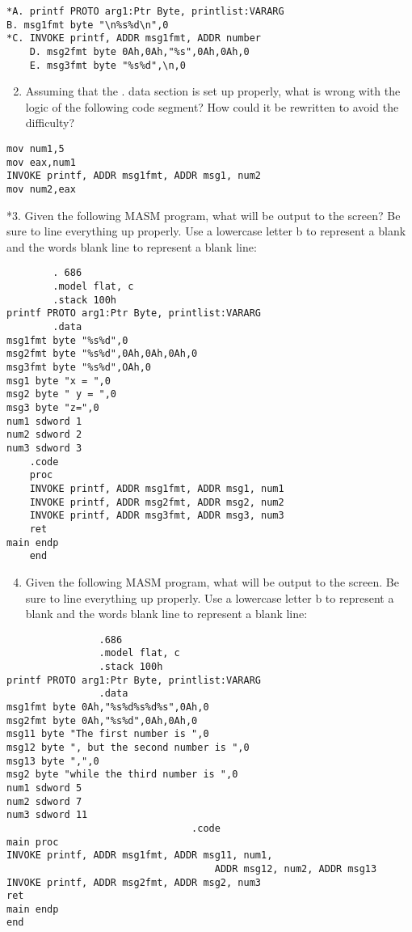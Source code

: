 \documentclass[10pt]{article}
\begin{document}
\begin{verbatim}
*A. printf PROTO arg1:Ptr Byte, printlist:VARARG
B. msg1fmt byte "\n%s%d\n",0
*C. INVOKE printf, ADDR msg1fmt, ADDR number
    D. msg2fmt byte 0Ah,0Ah,"%s",0Ah,0Ah,0
    E. msg3fmt byte "%s%d",\n,0
\end{verbatim}

\begin{enumerate}
  \setcounter{enumi}{1}
  \item Assuming that the . data section is set up properly, what is wrong with the logic of the following code segment? How could it be rewritten to avoid the difficulty?
\end{enumerate}

\begin{verbatim}
mov num1,5
mov eax,num1
INVOKE printf, ADDR msg1fmt, ADDR msg1, num2
mov num2,eax
\end{verbatim}

*3. Given the following MASM program, what will be output to the screen? Be sure to line everything up properly. Use a lowercase letter b to represent a blank and the words blank line to represent a blank line:

\begin{verbatim}
        . 686
        .model flat, c
        .stack 100h
printf PROTO arg1:Ptr Byte, printlist:VARARG
        .data
msg1fmt byte "%s%d",0
msg2fmt byte "%s%d",0Ah,0Ah,0Ah,0
msg3fmt byte "%s%d",OAh,0
msg1 byte "x = ",0
msg2 byte " y = ",0
msg3 byte "z=",0
num1 sdword 1
num2 sdword 2
num3 sdword 3
    .code
    proc
    INVOKE printf, ADDR msg1fmt, ADDR msg1, num1
    INVOKE printf, ADDR msg2fmt, ADDR msg2, num2
    INVOKE printf, ADDR msg3fmt, ADDR msg3, num3
    ret
main endp
    end
\end{verbatim}

\begin{enumerate}
  \setcounter{enumi}{3}
  \item Given the following MASM program, what will be output to the screen. Be sure to line everything up properly. Use a lowercase letter b to represent a blank and the words blank line to represent a blank line:
\end{enumerate}

\begin{verbatim}
                .686
                .model flat, c
                .stack 100h
printf PROTO arg1:Ptr Byte, printlist:VARARG
                .data
msg1fmt byte 0Ah,"%s%d%s%d%s",0Ah,0
msg2fmt byte 0Ah,"%s%d",0Ah,0Ah,0
msg11 byte "The first number is ",0
msg12 byte ", but the second number is ",0
msg13 byte ",",0
msg2 byte "while the third number is ",0
num1 sdword 5
num2 sdword 7
num3 sdword 11
                                .code
main proc
INVOKE printf, ADDR msg1fmt, ADDR msg11, num1,
                                    ADDR msg12, num2, ADDR msg13
INVOKE printf, ADDR msg2fmt, ADDR msg2, num3
ret
main endp
end
\end{verbatim}
\end{document}
